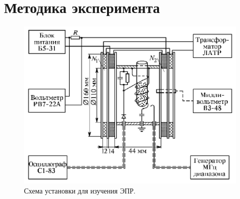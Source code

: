\documentclass[a4paper, 12pt]{article} %
\begin{document}
	\section{Методика эксперимента}
	
	\begin{figure}[h!]
		\centering
		\includegraphics[width=0.6\linewidth]{res/scheme.png}
		\caption{Схема установки для изучения ЭПР.}
		\label{fig:setup}
	\end{figure}
	
\end{document}
